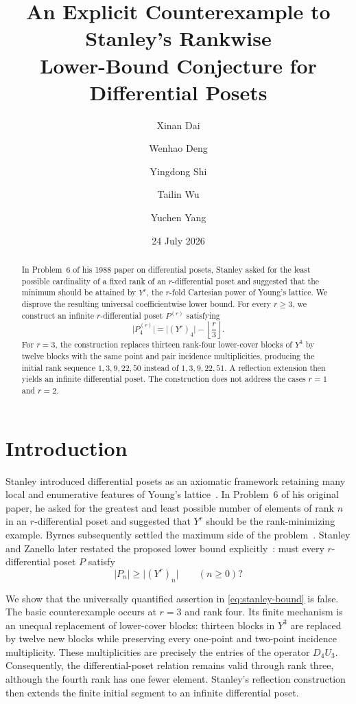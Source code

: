 \documentclass[11pt,a4paper]{amsart}
\title[Stanley's Differential-Poset Rank-Minimum Problem]
{An Explicit Counterexample to Stanley's Rankwise\\ 
Lower-Bound Conjecture for Differential Posets}
\author{Xinan Dai}
\author{Wenhao Deng}
\author{Yingdong Shi}
\author{Tailin Wu}
\author{Yuchen Yang}
\date{24 July 2026}
\theoremstyle{definition}
\theoremstyle{remark}
\newcommand{\card}[1]{\lvert #1\rvert}
\begin{document}
\begin{abstract}
In Problem~6 of his 1988 paper on differential posets, Stanley asked for the least possible cardinality of a fixed rank of an $r$-differential poset and suggested that the minimum should be attained by $Y^r$, the $r$-fold Cartesian power of Young's lattice. We disprove the resulting universal coefficientwise lower bound. For every $r\geq 3$, we construct an infinite $r$-differential poset $P^{(r)}$ satisfying
\[
  \card{P^{(r)}_4}
  =\card{(Y^r)_4}-\left\lfloor\frac r3\right\rfloor.
\]
For $r=3$, the construction replaces thirteen rank-four lower-cover blocks of $Y^3$ by twelve blocks with the same point and pair incidence multiplicities, producing the initial rank sequence $1,3,9,22,50$ instead of $1,3,9,22,51$. A reflection extension then yields an infinite differential poset. The construction does not address the cases $r=1$ and $r=2$.
\end{abstract}

\maketitle

\section*{Introduction}

Stanley introduced differential posets as an axiomatic framework retaining many local and enumerative features of Young's lattice~\cite{Stanley1988}. In Problem~6 of his original paper, he asked for the greatest and least possible number of elements of rank $n$ in an $r$-differential poset and suggested that $Y^r$ should be the rank-minimizing example. Byrnes subsequently settled the maximum side of the problem~\cite{Byrnes2012}. Stanley and Zanello later restated the proposed lower bound explicitly~\cite[Question~17]{StanleyZanello2012}: must every $r$-differential poset $P$ satisfy
\begin{equation}\label{eq:stanley-bound}
  \card{P_n}\geq \card{(Y^r)_n}
  \qquad(n\geq0)?
\end{equation}

We show that the universally quantified assertion in \eqref{eq:stanley-bound} is false. The basic counterexample occurs at $r=3$ and rank four. Its finite mechanism is an unequal replacement of lower-cover blocks: thirteen blocks in $Y^3$ are replaced by twelve new blocks while preserving every one-point and two-point incidence multiplicity. These multiplicities are precisely the entries of the operator $D_4U_3$. Consequently, the differential-poset relation remains valid through rank three, although the fourth rank has one fewer element. Stanley's reflection construction then extends the finite initial segment to an infinite differential poset.
\end{document}
